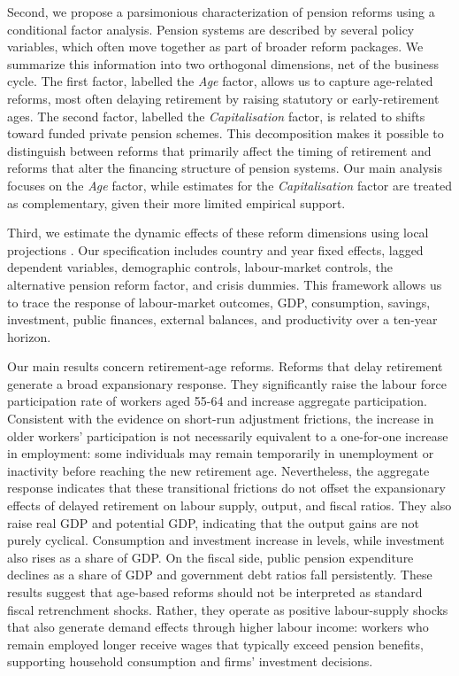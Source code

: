 \documentclass[11pt,english,a4paper, twoside, authoryear]{article}
\begin{document}
Second, we propose a parsimonious characterization of pension reforms using a conditional factor analysis. Pension systems are described by several policy variables, which often move together as part of broader reform packages. We summarize this information into two orthogonal dimensions, net of the business cycle. %
The first factor, labelled the \emph{Age} factor, allows us to capture age-related reforms, most often delaying retirement by raising statutory or early-retirement ages. The second factor, labelled the \emph{Capitalisation} factor, is related to shifts toward funded private pension schemes. This decomposition makes it possible to distinguish between reforms that primarily affect the timing of retirement and reforms that alter the financing structure of pension systems. Our main analysis focuses on the \emph{Age} factor, while estimates for the \emph{Capitalisation} factor are treated as complementary, given their more limited empirical support.

Third, we estimate the dynamic effects of these reform dimensions using local projections \citep{Jorda2005}. Our specification includes country and year fixed effects, lagged dependent variables, demographic controls, labour-market controls, the alternative pension reform factor, and crisis dummies. This framework allows us to trace the response of labour-market outcomes, GDP, consumption, savings, investment, public finances, external balances, and productivity over a ten-year horizon.

Our main results concern retirement-age reforms.  Reforms that delay retirement generate a broad expansionary response. They significantly raise the labour force participation rate of workers aged 55-64 and increase aggregate participation. Consistent with the evidence on short-run adjustment frictions, the increase in older workers' participation is not necessarily equivalent to a one-for-one increase in employment: some individuals may remain temporarily in unemployment or inactivity before reaching the new retirement age. Nevertheless, the aggregate response indicates that these transitional frictions do not offset the expansionary effects of delayed retirement on labour supply, output, and fiscal ratios. They also raise real GDP and potential GDP, indicating that the output gains are not purely cyclical. Consumption and investment increase in levels, while investment also rises as a share of GDP. On the fiscal side, public pension expenditure declines as a share of GDP and government debt ratios fall persistently. These results suggest that age-based reforms should not be interpreted as standard fiscal retrenchment shocks. Rather, they operate as positive labour-supply shocks that also generate demand effects through higher labour income: workers who remain employed longer receive wages that typically exceed pension benefits, supporting household consumption and firms' investment decisions.
\end{document}
